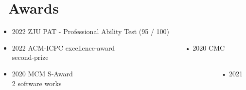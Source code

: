 \documentclass{resume}
\begin{document}

\section{\faCalendarCheckO\ Awards}
\begin{itemize}[parsep=0.5ex]
  \item 2022 ZJU PAT - Professional Ability Test (95 / 100) 
  
  \item 2022 ACM-ICPC excellence-award \ \ \ \ \ \ \ \ \ \ \ \ \ \ \ \ \ \ \ \  • 2020 CMC second-prize
  \item 2020 MCM S-Award \ \ \ \ \ \ \ \ \ \ \ \ \ \ \ \ \ \ \ \ \ \ \ \ \ \ \ \ \ \ \ \ \ \ \ \ \ \ \ \ \ \ \ • 2021 2 software works
\end{itemize}


%
%
\end{document}
